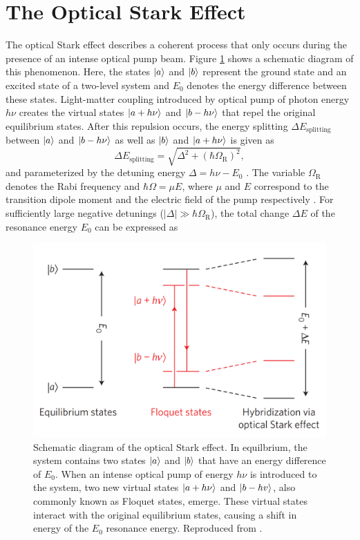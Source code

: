 \section{The Optical Stark Effect}
\label{sec:optical_stark_effect}

The optical Stark effect describes a coherent process that only occurs during the presence of an intense optical pump beam. Figure \ref{fig:optical_stark_effect_schematic_sie} shows a schematic diagram of this phenomenon. Here, the states $\ket{a}$ and $\ket{b}$ represent the ground state and an excited state of a two-level system and $E_0$ denotes the energy difference between these states. Light-matter coupling introduced by optical pump of photon energy $h \nu$ creates the virtual states $\ket{a + h \nu}$ and $\ket{b - h \nu}$ that repel the original equilibrium states. After this repulsion occurs, the energy splitting $\Delta E_\text{splitting}$ between $\ket{a}$  and $\ket{b - h \nu}$ as well as $\ket{b}$ and $\ket{a + h \nu}$ is given as
\begin{equation}
	\Delta E_\text{splitting} = \sqrt{\Delta^2 + (\hbar\Omega_\text{R})^2 },
\end{equation}
and parameterized by the detuning energy $\Delta = h \nu - E_0$ \cite{mysyrowicz1986dressed}. The variable $\Omega_\text{R}$ denotes the Rabi frequency and $\hbar \Omega = \mu E$, where $\mu$ and $E$ correspond to the transition dipole moment and the electric field of the pump respectively
\cite{mysyrowicz1986dressed}. For sufficiently large negative detunings ($|\Delta| \gg \hbar \Omega_\text{R}$), the total change $\Delta E$ of the resonance energy $E_0$ can be expressed as
\begin{figure}[ht]
	\centering
	\includegraphics[scale=0.3]{images/chapter_prior_works/optical_stark_effect_sie_2014}
	\caption{Schematic diagram of the optical Stark effect. In equilbrium, the system contains two states $\ket{a}$ and $\ket{b}$ that have an energy difference of $E_0$. When an intense optical pump of energy $h \nu$ is introduced to the system, two new virtual states $\ket{a + h \nu }$ and $\ket{b - hv}$, also commonly known as Floquet states, emerge. These virtual states interact with the original equilibrium states, causing a shift in energy of the $E_0$ resonance energy. Reproduced from \cite{sie2015valley}.}
	\label{fig:optical_stark_effect_schematic_sie}
\end{figure}


